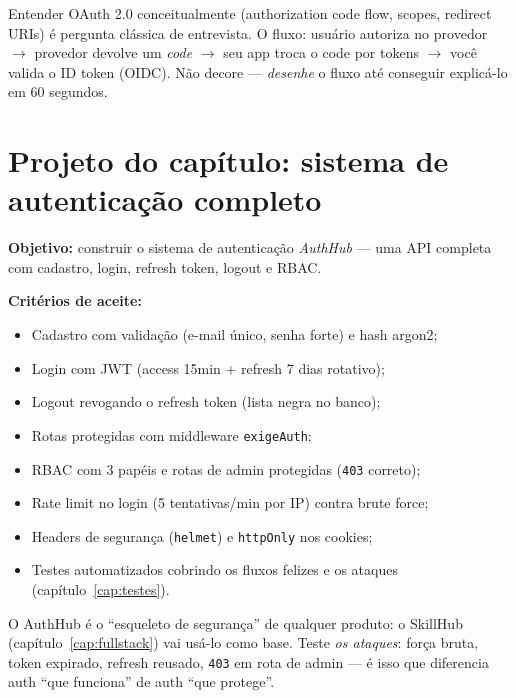 \begin{caixadica}
Entender OAuth 2.0 conceitualmente (authorization code flow, scopes,
redirect URIs) é pergunta clássica de entrevista. O fluxo: usuário autoriza no
provedor $\rightarrow$ provedor devolve um \emph{code} $\rightarrow$ seu app
troca o code por tokens $\rightarrow$ você valida o ID token (OIDC). Não
decore — \emph{desenhe} o fluxo até conseguir explicá-lo em 60 segundos.
\end{caixadica}

\section{Projeto do capítulo: sistema de autenticação completo}
\label{sec:projeto14}

\begin{caixaprojeto}
\textbf{Objetivo:} construir o sistema de autenticação \emph{AuthHub} — uma
API completa com cadastro, login, refresh token, logout e RBAC.

\textbf{Critérios de aceite:}
\begin{itemize}[leftmargin=*, itemsep=0.2em]
  \item Cadastro com validação (e-mail único, senha forte) e hash argon2;
  \item Login com JWT (access 15min + refresh 7 dias rotativo);
  \item Logout revogando o refresh token (lista negra no banco);
  \item Rotas protegidas com middleware \texttt{exigeAuth};
  \item RBAC com 3 papéis e rotas de admin protegidas (\texttt{403} correto);
  \item Rate limit no login (5 tentativas/min por IP) contra brute force;
  \item Headers de segurança (\texttt{helmet}) e \texttt{httpOnly} nos cookies;
  \item Testes automatizados cobrindo os fluxos felizes e os ataques (capítulo~\ref{cap:testes}).
\end{itemize}
\end{caixaprojeto}

\begin{caixadica}
O AuthHub é o ``esqueleto de segurança'' de qualquer produto: o SkillHub
(capítulo~\ref{cap:fullstack}) vai usá-lo como base. Teste \emph{os ataques}:
força bruta, token expirado, refresh reusado, \texttt{403} em rota de admin —
é isso que diferencia auth ``que funciona'' de auth ``que protege''.
\end{caixadica}

